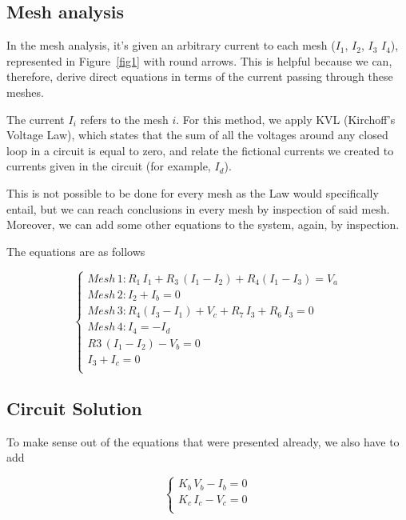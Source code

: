\subsection{Mesh analysis}


In the mesh analysis, it's given an arbitrary current to each mesh ($I_1$, $I_2$, $I_3$ $I_4$), represented in Figure~\ref{fig1} with round arrows. This is helpful because we can, therefore, derive direct equations in terms of the current passing through these meshes.

The current $I_i$ refers to the mesh $i$. For this method, we apply KVL (Kirchoff's Voltage Law), which states that the sum of all the voltages around any closed loop in a circuit is equal to zero, and relate the fictional currents we created to currents given in the circuit (for example, $I_d$).

This is not possible to be done for every mesh as the Law would specifically entail, but we can reach conclusions in every mesh by inspection of said mesh. Moreover, we can add some other equations to the system, again, by inspection.

The equations are as follows

\begin{equation} 
\begin{cases}  
    Mesh\, 1: R_1\,I_1 + R_3\,(I_1 - I_2) + R_4(I_1 - I_3) = V_a \\
    Mesh\, 2: I_2 + I_b = 0\\
    Mesh\, 3: R_4(I_3 - I_1) + V_c + R_7\,I_3 + R_6\,I_3 = 0 \\
    Mesh\, 4: I_4 = -I_d \\
    R3\, (I_1 - I_2) - V_b = 0\\
    I_3 + I_c = 0 \\

\end{cases}
\label{eq:2}
\end{equation}

\subsection{Circuit Solution}

To make sense out of the equations that were presented already, we also have to add

\begin{equation} 
\begin{cases}  
   K_b\,V_b - I_b = 0 \\
  K_c\, I_c - V_c = 0 \\
\end{cases}
\label{eq:3}
\end{equation}


